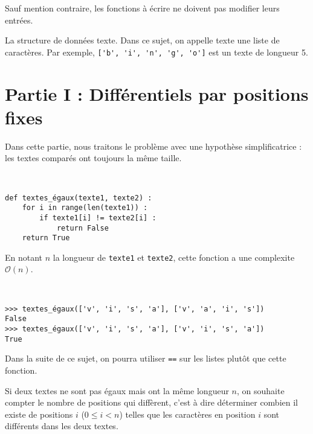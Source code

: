 Sauf mention contraire, les fonctions à écrire ne doivent pas modifier leurs entrées.

La structure de données texte. Dans ce sujet, on appelle texte une liste de caractères. Par
exemple, \lstinline{['b', 'i', 'n', 'g', 'o']} est un texte de longueur 5.


\section*{Partie I : Différentiels par positions fixes}
Dans cette partie, nous traitons le problème avec une hypothèse simplificatrice : les textes
comparés ont toujours la même taille.

\ifprof
\begin{corrige}~\\ 
\vspace{-.5cm}
\begin{lstlisting}
def textes_égaux(texte1, texte2) :
    for i in range(len(texte1)) :
        if texte1[i] != texte2[i] :
            return False
    return True
\end{lstlisting}
En notant $n$ la longueur de \lstinline{texte1} et \lstinline{texte2}, cette fonction a une complexite $\mathcal{O}(n)$.
\end{corrige}
\else

\fi
\begin{exemple}~\\ 
\vspace{-.5cm}
\begin{lstlisting}
>>> textes_égaux(['v', 'i', 's', 'a'], ['v', 'a', 'i', 's'])
False
>>> textes_égaux(['v', 'i', 's', 'a'], ['v', 'i', 's', 'a'])
True
\end{lstlisting}
\end{exemple}


Dans la suite de ce sujet, on pourra utiliser \lstinline{==} sur les listes plutôt que cette fonction.

Si deux textes ne sont pas égaux mais ont la même longueur $n$, on souhaite compter le nombre
de positions qui diffèrent, c'est à dire déterminer combien il existe de positions $i$ ($0\leq i < n$)
telles que les caractères en position $i$ sont différents dans les deux textes.

